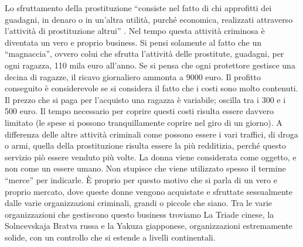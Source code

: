 \documentclass[a4paper, 11pt]{article}
\begin{document}

Lo sfruttamento della prostituzione “consiste nel fatto di chi approfitti dei guadagni, in denaro o in un’altra utilità, purché economica, realizzati attraverso l’attività di prostituzione altrui” . Nel tempo questa attività criminosa è diventata un vero e proprio business. Si pensi solamente al fatto che un “magnaccia”, ovvero colui che sfrutta l’attività delle prostitute, guadagni, per ogni ragazza, 110 mila euro all’anno. Se si pensa che ogni protettore gestisce una decina di ragazze, il ricavo giornaliero ammonta a 9000 euro. Il profitto conseguito è considerevole se si considera il fatto che i costi sono molto contenuti. Il prezzo che si paga per l’acquisto una ragazza è variabile; oscilla tra i 300 e i 500 euro. Il tempo necessario per coprire questi costi risulta essere davvero limitato (le spese si possono tranquillamente coprire nel giro di un giorno). A differenza delle altre attività criminali come possono essere i vari traffici, di droga o armi, quella della prostituzione risulta essere la più redditizia, perché questo servizio piò essere venduto più volte. 
La donna viene considerata come oggetto, e non come un essere umano. Non stupisce che viene utilizzato spesso il termine “merce” per indicarle. È proprio per questo motivo che si parla di un vero e proprio mercato, dove queste donne vengono acquistate e sfruttate sessualmente dalle varie organizzazioni criminali, grandi o piccole che siano. Tra le varie organizzazioni che gestiscono questo business troviamo La Triade cinese, la Solncevskaja Bratva russa e la Yakuza giapponese, organizzazioni estremamente solide, con un controllo che si estende a livelli continentali.

\newpage
\end{document}
